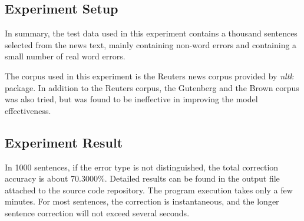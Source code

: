 \documentclass{article}
\begin{document}
\subsection{Experiment Setup}

In summary, the test data used in this experiment contains a thousand
sentences selected from the news text, mainly containing non-word
errors and containing a small number of real word errors.

The corpus used in this experiment is the Reuters news corpus provided
by \textit{nltk} package. In addition to the Reuters corpus, the Gutenberg
and the Brown corpus was also tried, but was found to be ineffective
in improving the model effectiveness.

\subsection{Experiment Result}

In 1000 sentences, if the error type is not distinguished, the total
correction accuracy is about 70.3000\%. Detailed results can be found
in the output file attached to the source code repository. The program
execution takes only a few minutes. For most sentences, the correction
is instantaneous, and the longer sentence correction will not exceed
several seconds.



\end{document}
